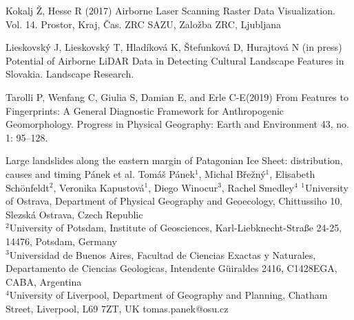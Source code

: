 {Kokalj Ž, Hesse R (2017) Airborne Laser Scanning Raster Data Visualization. Vol. 14. Prostor, Kraj, Čas. ZRC SAZU, Založba ZRC, Ljubljana

Lieskovský J, Lieskovský T, Hladíková K, Štefunková D, Hurajtová N (in press) Potential of Airborne LiDAR Data in Detecting Cultural Landscape Features in Slovakia. Landscape Research.

Tarolli P, Wenfang C, Giulia S, Damian E, and Erle C-E(2019) From Features to Fingerprints: A General Diagnostic Framework for Anthropogenic Geomorphology. Progress in Physical Geography: Earth and Environment 43, no. 1: 95–128.}%

\abstract
{Large landslides along the eastern margin of Patagonian Ice Sheet: distribution, causes and timing} %
{Pánek et al.} %
{Tomáš Pánek$^1$, Michal Břežný$^1$, Elisabeth Schönfeldt$^2$, Veronika Kapustová$^1$, Diego Winocur$^3$, Rachel Smedley$^4$} %
{\KLtag} %
{$^1$University of Ostrava, Department of Physical Geography and Geoecology, Chittussiho 10, Slezská Ostrava, Czech Republic \\
	$^2$University of Potsdam, Institute of Geosciences, Karl-Liebknecht-Straße 24-25, 14476, Potsdam, Germany \\
	$^3$Universidad de Buenos Aires, Facultad de Ciencias Exactas y Naturales, Departamento de Ciencias Geologicas, Intendente Güiraldes 2416, C1428EGA, CABA, Argentina \\
	$^4$University of Liverpool, Department of Geography and Planning, Chatham Street, Liverpool, L69 7ZT, UK} %
{tomas.panek@osu.cz}  %
{}%
